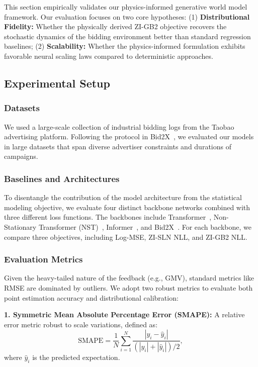\documentclass[sigconf, anonymous, review]{acmart}
\begin{document}
This section empirically validates our physics-informed generative world model framework. 
Our evaluation focuses on two core hypotheses: 
(1) \textbf{Distributional Fidelity:} Whether the physically derived ZI-GB2 objective recovers the stochastic dynamics of the bidding environment better than standard regression baselines; 
(2) \textbf{Scalability:} Whether the physics-informed formulation exhibits favorable neural scaling laws compared to deterministic approaches.

\subsection{Experimental Setup}

\subsubsection{Datasets}
We used a large-scale collection of industrial bidding logs from the Taobao advertising platform. Following the protocol in Bid2X~\cite{Bid2X}, we evaluated our models in large datasets that span diverse advertiser constraints and durations of campaigns.

\subsubsection{Baselines and Architectures}
To disentangle the contribution of the model architecture from the statistical modeling objective, we evaluate four distinct backbone networks combined with three different loss functions. The backbones include Transformer~\cite{vaswani2017attention}, Non-Stationary Transformer (NST)~\cite{liu2022nonstationary}, Informer~\cite{zhou2021informer}, and Bid2X~\cite{Bid2X}.
For each backbone, we compare three objectives, including Log-MSE, ZI-SLN NLL, and ZI-GB2 NLL.

\subsubsection{Evaluation Metrics}
Given the heavy-tailed nature of the feedback (e.g., GMV), standard metrics like RMSE are dominated by outliers. We adopt two robust metrics to evaluate both point estimation accuracy and distributional calibration:

\textbf{1. Symmetric Mean Absolute Percentage Error (SMAPE):} 
A relative error metric robust to scale variations, defined as:
\begin{equation}
    \text{SMAPE} = \frac{1}{N} \sum_{i=1}^N \frac{|y_i - \hat{y}_i|}{(|y_i| + |\hat{y}_i|)/2},
\end{equation}
where $\hat{y}_i$ is the predicted expectation.
\end{document}

